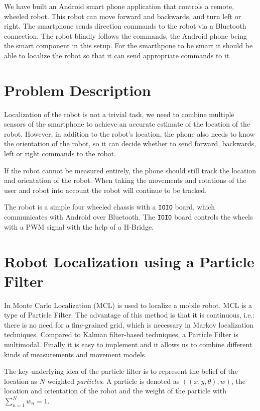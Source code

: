 \documentclass[journal]{IEEEtran}
\begin{document}
We have built an Android smart phone application that controls a remote,
wheeled robot. This robot can move forward and backwards, and turn left or
right. The smartphone sends direction commands to the robot via a Bluetooth
connection.  The robot blindly follows the commands, the Android phone being
the smart component in this setup. For the smarthpone to be smart it should be
able to localize the robot so that it can send appropriate commands to it.

\section{Problem Description}

Localization of the robot is not a trivial task, we need to combine multiple
sensors of the smartphone to achieve an accurate estimate of the location of
the robot. However, in addition to the robot's location, the phone also needs
to know the orientation of the robot, so it can decide whether to send forward,
backwards, left or right commands to the robot.

If the robot cannot be measured entirely, the phone should still track the
location and orientation of the robot. When taking the movements and
rotations of the user and robot into account the robot will continue to be
tracked.

The robot is a simple four wheeled chassis with a \texttt{IOIO} board,
which communicates with Android over Bluetooth. The \texttt{IOIO} board
controls the wheels with a PWM signal with the help of a H-Bridge.

\section{Robot Localization using a Particle Filter}

In \cite{fox1999monte} Monte Carlo Localization (MCL) is used to localize a
mobile robot. MCL is a type of Particle Filter. The advantage of this method is
that it is continuous, i.e.: there is no need for a fine-grained grid, which is
necessary in Markov localization techniques. Compared to Kalman filter-based
techniques, a Particle Filter is multimodal. Finally it is easy to implement
and it allows us to combine different kinds of measurements and movement
models.

The key underlying idea of the particle filter is to represent the belief
of the location as $N$ weighted \emph{particles}. A particle is denoted as
$((x,y,\theta),w)$, the location and orientation of the robot and
the weight of the particle with $\sum_{n=1}^N w_n = 1$.
\end{document}

